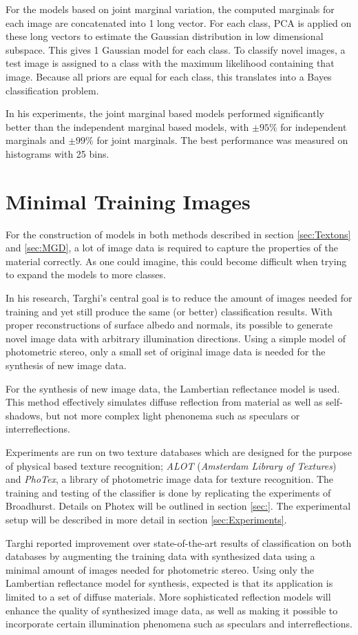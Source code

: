 For the models based on joint marginal variation, the computed marginals for each image are concatenated into 1 long vector. For each class, PCA is applied on these long vectors to estimate the Gaussian distribution in low dimensional subspace. This gives 1 Gaussian model for each class. To classify novel images, a test image is assigned to a class with the maximum likelihood containing that image. Because all priors are equal for each class, this translates into a Bayes classification problem.

In his experiments, the joint marginal based models performed significantly better than the independent marginal based models, with $\pm 95\%$ for independent marginals and $\pm 99\%$ for joint marginals. The best performance was measured on histograms with 25 bins. 

\section{Minimal Training Images}\label{sec:Minimal}

For the construction of models in both methods described in section \ref{sec:Textons} and \ref{sec:MGD}, a lot of image data is required to capture the properties of the material correctly. As one could imagine, this could become difficult when trying to expand the models to more classes.

In his research, Targhi's central goal is to reduce the amount of images needed for training and yet still produce the same (or better) classification results. With proper reconstructions of surface albedo and normals, its possible to generate novel image data with arbitrary illumination directions. Using a simple model of photometric stereo, only a small set of original image data is needed for the synthesis of new image data.

For the synthesis of new image data, the Lambertian reflectance model is used. This method effectively simulates diffuse reflection from material as well as self-shadows, but not more complex light phenonema such as speculars or interreflections. 

Experiments are run on two texture databases which are designed for the purpose of physical based texture recognition; \textit{ALOT} (\textit{Amsterdam Library of Textures}) and \textit{PhoTex}, a library of photometric image data for texture recognition. The training and testing of the classifier is done by replicating the experiments of Broadhurst. Details on Photex will be outlined in section \ref{sec:}. The experimental setup will be described in more detail in section \ref{sec:Experiments}.

Targhi reported improvement over state-of-the-art results of classification on both databases by augmenting the training data with synthesized data using a minimal amount of images needed for photometric stereo. Using only the Lambertian reflectance model for synthesis, expected is that its application is limited to a set of diffuse materials. More sophisticated reflection models will enhance the quality of synthesized image data, as well as making it possible to incorporate certain illumination phenomena such as speculars and interreflections.

